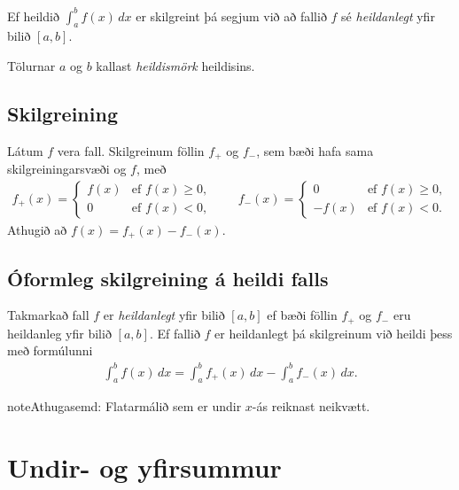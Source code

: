 \documentclass[a4paper,10pt,icelandic]{sphinxmanual}
\begin{document}
Ef heildið \(\int_a^b f(x)\,dx\) er skilgreint þá segjum við að
fallið \(f\) sé \textit{heildanlegt} yfir bilið \([a,b]\).

Tölurnar \(a\) og \(b\) kallast \textit{heildismörk} heildisins.


\subsection{Skilgreining}
\label{kafli06:skilgreining}
Látum \(f\) vera fall. Skilgreinum föllin \(f_+\) og
\(f_-\), sem bæði hafa sama skilgreiningarsvæði og \(f\), með
\begin{equation*}
\begin{split}f_+(x)=\left\{\begin{array}{ll} f(x) & \mbox{ef }f(x)\geq 0,\\
  0 & \mbox{ef }f(x)<0, \end{array} \right. \qquad
  f_-(x)=\left\{\begin{array}{ll} 0 & \mbox{ef }f(x)\geq 0,\\
  -f(x) & \mbox{ef }f(x)<0. \end{array}\right.\end{split}
\end{equation*}
Athugið að \(f(x)=f_+(x)-f_-(x)\).



\subsection{Óformleg skilgreining á heildi falls}
\label{kafli06:oformleg-skilgreining-a-heildi-falls}
Takmarkað fall \(f\) er \emph{heildanlegt} yfir bilið \([a, b]\) ef
bæði föllin \(f_+\) og \(f_-\) eru heildanleg yfir bilið
\([a,
b]\). Ef fallið \(f\) er heildanlegt þá skilgreinum við heildi þess
með formúlunni
\begin{equation*}
\begin{split}\int_a^b f(x)\,dx=\int_a^b f_+(x)\,dx-\int_a^b f_-(x)\,dx.\end{split}
\end{equation*}
\begin{notice}{note}{Athugasemd:}
Flatarmálið sem er undir \(x\)-ás reiknast neikvætt.
\end{notice}


\section{Undir- og yfirsummur}
\label{kafli06:undir-og-yfirsummur}
\end{document}
